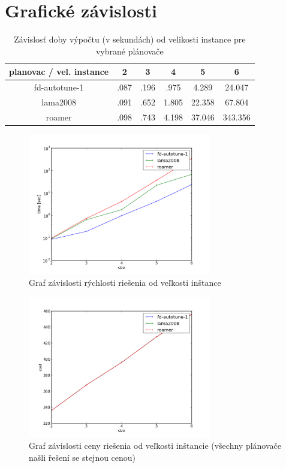 \documentclass[a4paper,journal]{IEEEtran}
\begin{document}
\section{Grafick\'e z\'avislosti}


\begin{table}[!h]
  \label{tbl:speed}
\caption{Z\'avislos\v t doby v\'ypo\v ctu (v sekund\'ach) od velikosti instance pre vybran\'e pl\'anova\v ce}
\begin{center}
\begin{tabular}{|c|c|c|c|c|c|}\hline
\textbf{planovac} / \textbf{vel. instance} & 2 & 3 & 4 & 5 & 6 \\ \hline
fd-autotune-1 & .087 & .196 & .975 & 4.289 & 24.047 \\ \hline
lama2008 & .091 & .652 & 1.805 & 22.358 & 67.804 \\ \hline
roamer & .098 & .743 & 4.198 & 37.046 & 343.356 \\ \hline
\end{tabular}
\end{center}
\end{table}

\begin{figure}[h]%
  \centering
  \includegraphics[width=80mm]{speed}
  \caption{Graf z\'avislosti r\'ychlosti rie\v senia od ve\v lkosti in\v stance}
  \label{fig:speed}
\end{figure}
\begin{figure}[h]%
  \centering
  \includegraphics[width=80mm]{qual}
  \caption{Graf z\'avislosti ceny rie\v senia od ve\v lkosti in\v stancie (v\v sechny pl\'anova\v ce na\v sli \v re\v sen\'i se stejnou cenou)}
  \label{fig:qual}
\end{figure}
%
\end{document}
